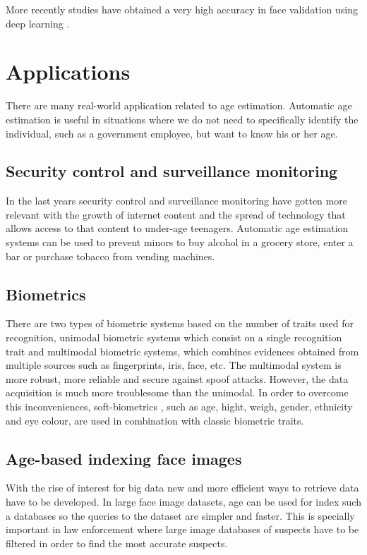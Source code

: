 More recently studies have obtained a very high accuracy in face validation using deep learning \cite{taigman2014deepface}.


\section{Applications}
There are many real-world application related to age estimation. Automatic age estimation is useful in situations where we do not need to specifically identify the individual, such as a government employee, but want to know his or her age.

\subsection{Security control and surveillance monitoring}
In the last years security control and surveillance monitoring have gotten more relevant with the growth of internet content and the spread of technology that allows access to that content to under-age teenagers. Automatic age estimation systems can be used to prevent minors to buy alcohol in a grocery store, enter a bar or purchase tobacco from vending machines.

\subsection{Biometrics}
There are two types of biometric systems based on the number of traits used for recognition, unimodal biometric systems which consist on a single recognition trait and multimodal biometric systems, which combines evidences obtained from multiple sources \cite{MSU-CSE-99-39} such as fingerprints, iris, face, etc. The multimodal system is more robust, more reliable and secure against spoof attacks. However, the data acquisition is much more troublesome than the unimodal. In order to overcome this inconveniences, soft-biometrics \cite{conf/icba/JainDN04}, such as age, hight, weigh, gender, ethnicity and eye colour, are used in combination with classic biometric traits. 

\subsection{Age-based indexing face images}
With the rise of interest for big data new and more efficient ways to retrieve data have to be developed. In large face image datasets, age can be used for index such a databases so the queries to the dataset are simpler and faster. This is specially important in law enforcement where large image databases of suspects have to be filtered in order to find the most accurate suspects.

